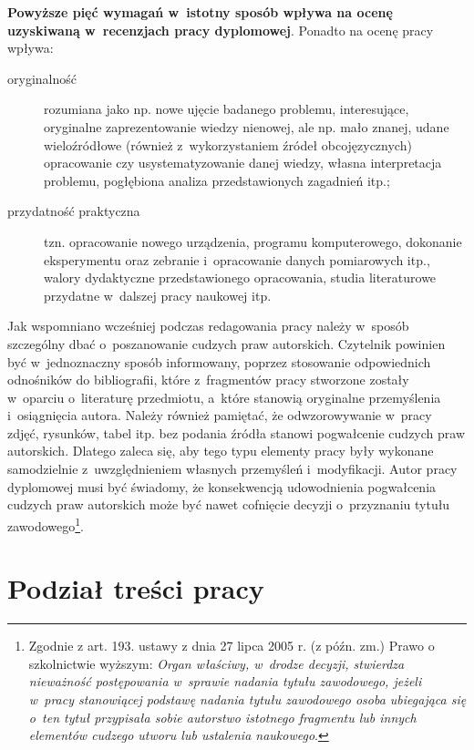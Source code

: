 \documentclass[skorowidz,skroty]{dyplomWEZUT}
\begin{document}
\noindent\textbf{Powyższe pięć wymagań w~istotny sposób wpływa na ocenę uzyskiwaną w~recenzjach pracy dyplomowej}. Ponadto na ocenę pracy wpływa:

\begin{description}
\item [oryginalność] rozumiana jako np. nowe ujęcie badanego problemu, interesujące, oryginalne zaprezentowanie wiedzy nienowej, ale np. mało znanej, udane wieloźródłowe (również z~wykorzystaniem źródeł obcojęzycznych) opracowanie czy usystematyzowanie danej wiedzy, własna interpretacja problemu, pogłębiona analiza przedstawionych zagadnień itp.;
\item [przydatność praktyczna] tzn. opracowanie nowego urządzenia, programu komputerowego, dokonanie eksperymentu oraz zebranie i~opracowanie danych pomiarowych itp., walory dydaktyczne przedstawionego opracowania, studia literaturowe przydatne w~dalszej pracy naukowej itp.
\end{description}

\noindent Jak wspomniano wcześniej podczas redagowania pracy należy w~sposób szczególny dbać o~poszanowanie cudzych praw autorskich. Czytelnik powinien być w~jednoznaczny sposób informowany, poprzez stosowanie odpowiednich odnośników do bibliografii, które z~fragmentów pracy stworzone zostały w~oparciu o~literaturę przedmiotu, a~które stanowią oryginalne przemyślenia i~osiągnięcia autora. Należy również pamiętać, że odwzorowywanie w~pracy zdjęć, rysunków, tabel itp. bez podania źródła stanowi pogwałcenie cudzych praw autorskich. Dlatego zaleca się, aby tego typu elementy pracy były wykonane samodzielnie z~uwzględnieniem własnych przemyśleń i~modyfikacji. Autor pracy dyplomowej musi być świadomy, że konsekwencją udowodnienia pogwałcenia cudzych praw autorskich może być nawet cofnięcie decyzji o~przyznaniu tytułu zawodowego\footnote{Zgodnie z art. 193. ustawy z dnia 27 lipca 2005 r. (z późn. zm.) Prawo o szkolnictwie wyższym: \textit{Organ właściwy, w~drodze decyzji, stwierdza nieważność postępowania w~sprawie nadania tytułu zawodowego, jeżeli w~pracy stanowiącej podstawę nadania tytułu zawodowego osoba ubiegająca się o~ten tytuł przypisała sobie autorstwo istotnego fragmentu lub innych elementów cudzego utworu lub ustalenia naukowego}.}.

\section{Podział treści pracy}\label{sec:podzialtresci}
\end{document}
